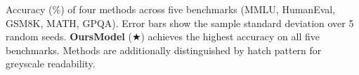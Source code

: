\caption{Accuracy (\%) of four methods across five benchmarks (MMLU, HumanEval, GSM8K, MATH, GPQA). Error bars show the sample standard deviation over 5 random seeds. \textbf{OursModel} (★) achieves the highest accuracy on all five benchmarks. Methods are additionally distinguished by hatch pattern for greyscale readability.}

